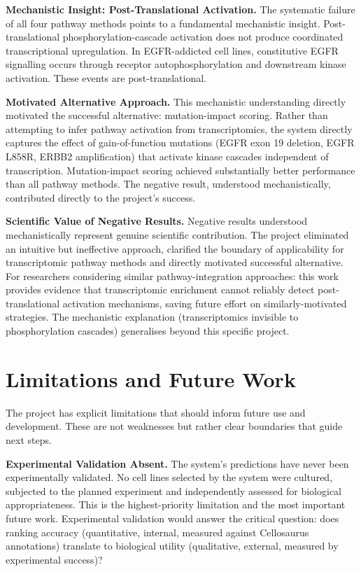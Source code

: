 \documentclass[author={Karen Coutinho, Ishaan Bhalla, Aman Raj, Dixit Kaloorani Malarmannan},
                supervisor={Dr. Daniel D'Andrea},
                degree={MSc},
                title={CellSelector Omics: A Multi-Omics Recommendation System for Cell Line Selection},
                subtitle={},
                type={},
                year={2026}]{dissertation}
\begin{document}
{\bf Mechanistic Insight: Post-Translational Activation.} The systematic failure of all four pathway methods points to a fundamental mechanistic insight. Post-translational phosphorylation-cascade activation does not produce coordinated transcriptional upregulation. In EGFR-addicted cell lines, constitutive EGFR signalling occurs through receptor autophosphorylation and downstream kinase activation. These events are post-translational.

{\bf Motivated Alternative Approach.} This mechanistic understanding directly motivated the successful alternative: mutation-impact scoring. Rather than attempting to infer pathway activation from transcriptomics, the system directly captures the effect of gain-of-function mutations (EGFR exon 19 deletion, EGFR L858R, ERBB2 amplification) that activate kinase cascades independent of transcription. Mutation-impact scoring achieved substantially better performance than all pathway methods. The negative result, understood mechanistically, contributed directly to the project's success.

{\bf Scientific Value of Negative Results.} Negative results understood mechanistically represent genuine scientific contribution. The project eliminated an intuitive but ineffective approach, clarified the boundary of applicability for transcriptomic pathway methods and directly motivated successful alternative. For researchers considering similar pathway-integration approaches: this work provides evidence that transcriptomic enrichment cannot reliably detect post-translational activation mechanisms, saving future effort on similarly-motivated strategies. The mechanistic explanation (transcriptomics invisible to phosphorylation cascades) generalises beyond this specific project.

\section{Limitations and Future Work}

The project has explicit limitations that should inform future use and development. These are not weaknesses but rather clear boundaries that guide next steps.

{\bf Experimental Validation Absent.} The system's predictions have never been experimentally validated. No cell lines selected by the system were cultured, subjected to the planned experiment and independently assessed for biological appropriateness. This is the highest-priority limitation and the most important future work. Experimental validation would answer the critical question: does ranking accuracy (quantitative, internal, measured against Cellosaurus annotations) translate to biological utility (qualitative, external, measured by experimental success)?
\end{document}
